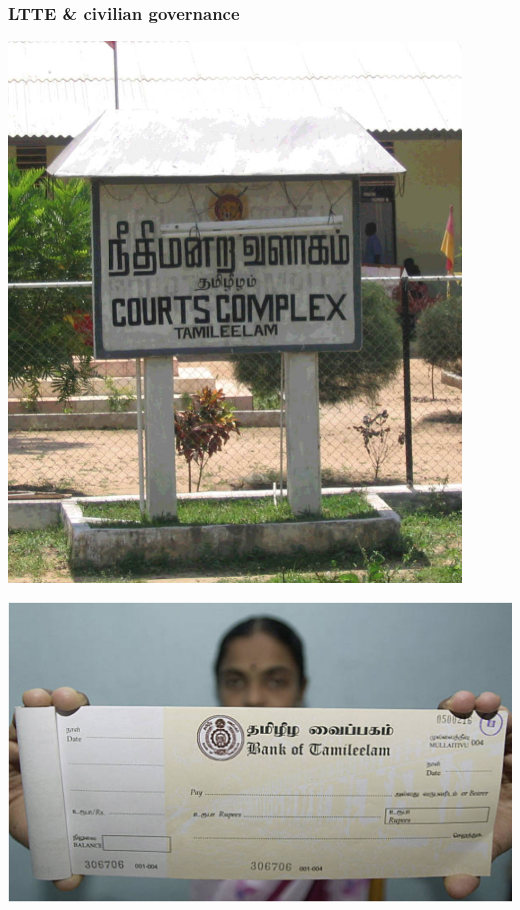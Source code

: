 \documentclass[utf8, xcolor=dvipsnames]{beamer}
\begin{document}
\begin{frame}
\frametitle{LTTE \& civilian governance}
\centering

\begin{minipage}{0.4\textwidth}\centering
  \includegraphics[width = 0.9\textwidth]{img/tamileelam_courts}
  \vfill
\end{minipage}\hfill
\begin{minipage}{0.59\textwidth}\centering
  \includegraphics[width = \textwidth]{img/tamileelam_bank}\\

\end{minipage}
\end{frame}
\end{document}
